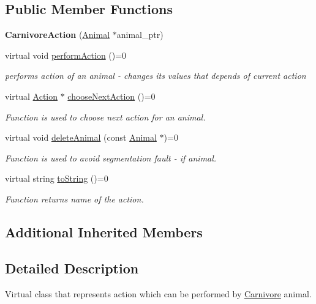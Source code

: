 \subsection*{Public Member Functions}
\begin{DoxyCompactItemize}
\item 
\hypertarget{class_carnivore_action_a0d83784d9df308959871ade0908f07dd}{}{\bfseries Carnivore\+Action} (\hyperlink{class_animal}{Animal} $\ast$animal\+\_\+ptr)\label{class_carnivore_action_a0d83784d9df308959871ade0908f07dd}

\item 
virtual void \hyperlink{class_carnivore_action_ae396f2f07131c21813e7986be130438e}{perform\+Action} ()=0
\begin{DoxyCompactList}\small\item\em performs action of an animal -\/ changes it\textquotesingle{}s values that depends of current action \end{DoxyCompactList}\item 
virtual \hyperlink{class_action}{Action} $\ast$ \hyperlink{class_carnivore_action_ae16f836240641508899939c33f9dffd7}{choose\+Next\+Action} ()=0
\begin{DoxyCompactList}\small\item\em Function is used to choose next action for an animal. \end{DoxyCompactList}\item 
virtual void \hyperlink{class_carnivore_action_aedd1918537fb9cf3172ec86cbab062af}{delete\+Animal} (const \hyperlink{class_animal}{Animal} $\ast$)=0
\begin{DoxyCompactList}\small\item\em Function is used to avoid segmentation fault -\/ if animal. \end{DoxyCompactList}\item 
virtual string \hyperlink{class_carnivore_action_a2c955f0de63b624b23d15e913060bf2a}{to\+String} ()=0
\begin{DoxyCompactList}\small\item\em Function returns name of the action. \end{DoxyCompactList}\end{DoxyCompactItemize}
\subsection*{Additional Inherited Members}


\subsection{Detailed Description}
Virtual class that represents action which can be performed by \hyperlink{class_carnivore}{Carnivore} animal. 

